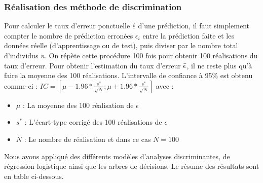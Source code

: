 \documentclass[a4paper,11pt,oneside,roman]{article}
\begin{document}
\subsubsection{Réalisation des méthode de discrimination}
Pour calculer le taux d'erreur ponctuelle $\Hat{\epsilon}$ d'une prédiction, il faut simplement compter le nombre de prédiction erronées $\epsilon_i$ entre la prédiction faite et les données réelle (d'apprentissage ou de test), puis diviser par le nombre total d'individus \textit{n}. \newline
On répète cette procédure 100 fois pour obtenir 100 réalisations du taux d'erreur. Pour obtenir l'estimation du taux d'erreur $\Bar{\epsilon}$, il ne reste plus qu'à faire la moyenne des 100 réalisations. \newline
L'intervalle de confiance à 95\% est obtenu comme-ci : $IC = \left[\mu - 1.96*\frac{s^{*}}{\sqrt{N}};\mu + 1.96*\frac{s^{*}}{\sqrt{N}} \right]$ avec : \newline
\begin{itemize}
    \item $\mu$ : La moyenne des 100 réalisation de $\epsilon$ \\
    \item $s^{*}$ : L'écart-type corrigé des 100 réalisations de $\epsilon$ \\
    \item $N$ : Le nombre de réalisation et dans ce cas $N=100$
\end{itemize}
Nous avons appliqué des différents modèles d'analyses discriminantes, de régression logistique ainsi que les arbres de décisions. Le résume des résultats sont en table ci-dessous.
\end{document}
